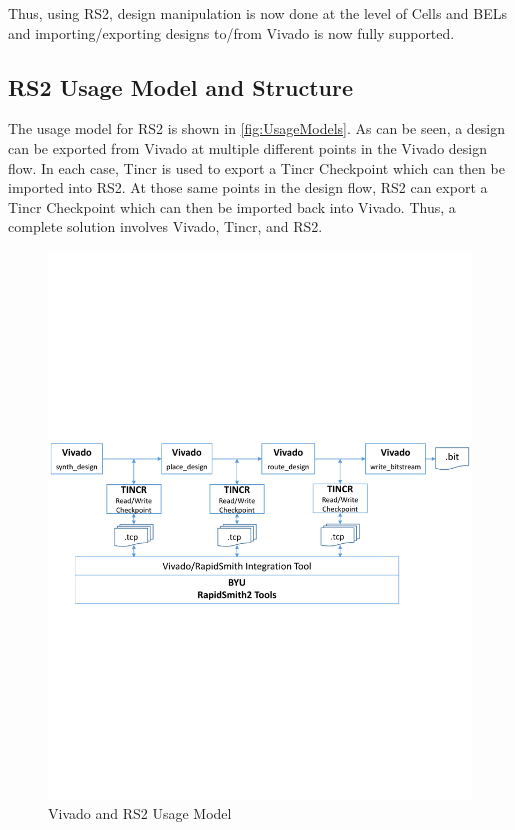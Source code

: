 \documentclass[12pt]{article}
\begin{document}
Thus, using RS2, design manipulation is now done at the level of Cells and BELs
and importing/exporting designs to/from Vivado is now fully supported.

\subsection{RS2 Usage Model and Structure}
The usage model for RS2 is shown in \autoref{fig:UsageModels}.  As can be
seen, a design can be exported from Vivado at multiple different points in the
Vivado design flow.  In each case, Tincr is used to export a Tincr Checkpoint
which can then be imported into RS2.  At those same points in the design flow,
RS2 can export a Tincr Checkpoint which can then be imported back into Vivado. 
Thus, a complete solution involves Vivado, Tincr, and RS2.

\begin{figure}[htb]
\centering
\includegraphics[width=\columnwidth]{UsageModels}
\caption{Vivado and RS2 Usage Model}
\label{fig:UsageModels}
\end{figure} 
\end{document}
